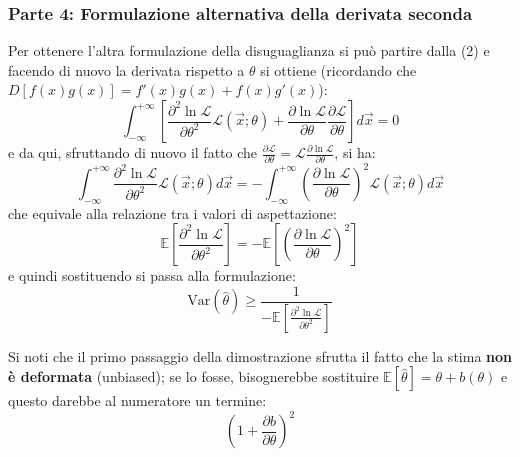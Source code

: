 \documentclass[openany,a4paper,12pt]{book}
\providecommand{\mathscr}[1]{\mathcal{#1}}
\theoremstyle{remark}
\begin{document}
\subsubsection*{Parte 4: Formulazione alternativa della derivata seconda}
Per ottenere l'altra formulazione della disuguaglianza si può partire dalla (2) e facendo di nuovo la derivata rispetto a $\theta$ si ottiene (ricordando che $D[f(x)g(x)] = f'(x)g(x) + f(x)g'(x)$):
\begin{equation}
    \int_{-\infty}^{+\infty} \left[ \frac{\partial^2 \ln \mathscr{L}}{\partial \theta^2} \mathscr{L}(\vec{x}; \theta) + \frac{\partial \ln \mathscr{L}}{\partial \theta} \frac{\partial \mathscr{L}}{\partial \theta} \right] d\vec{x} = 0
\end{equation}
e da qui, sfruttando di nuovo il fatto che $\frac{\partial \mathscr{L}}{\partial \theta} = \mathscr{L} \frac{\partial \ln \mathscr{L}}{\partial \theta}$, si ha:
\begin{equation}
    \int_{-\infty}^{+\infty} \frac{\partial^2 \ln \mathscr{L}}{\partial \theta^2} \mathscr{L}(\vec{x}; \theta) d\vec{x} = -\int_{-\infty}^{+\infty} \left( \frac{\partial \ln \mathscr{L}}{\partial \theta} \right)^2 \mathscr{L}(\vec{x}; \theta) d\vec{x}
\end{equation}
che equivale alla relazione tra i valori di aspettazione:
\begin{equation}\tag{4}
    \boxed{ \mathbb{E}\left[ \frac{\partial^2 \ln \mathscr{L}}{\partial \theta^2} \right] = -\mathbb{E}\left[ \left( \frac{\partial \ln \mathscr{L}}{\partial \theta} \right)^2 \right] }
\end{equation}
e quindi sostituendo si passa alla formulazione:
\begin{equation}
    \mathrm{Var}(\hat{\theta}) \geq \frac{1}{-\mathbb{E}\left[ \frac{\partial^2 \ln \mathscr{L}}{\partial \theta^2} \right]}
\end{equation}

Si noti che il primo passaggio della dimostrazione sfrutta il fatto che la stima \textbf{non è deformata} (unbiased); se lo fosse, bisognerebbe sostituire $\mathbb{E}[\hat{\theta}] = \theta + b(\theta)$ e questo darebbe al numeratore un termine:
\begin{equation}
    \left( 1 + \frac{\partial b}{\partial \theta} \right)^2
\end{equation}
 
\end{document}
